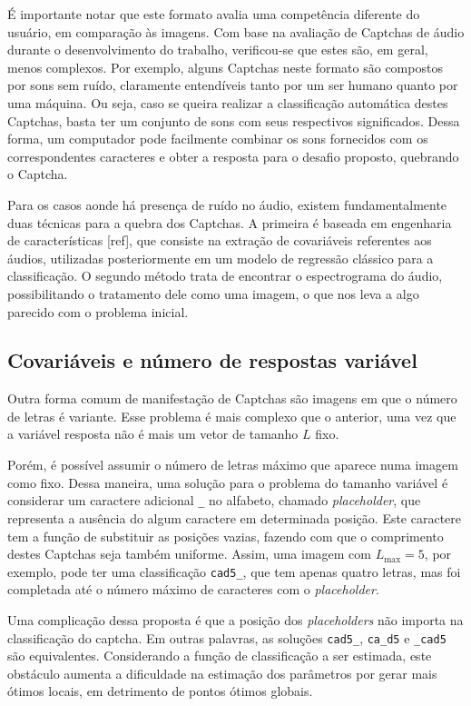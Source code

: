 \documentclass[12pt,]{report}
\begin{document}
É importante notar que este formato avalia uma competência diferente do
usuário, em comparação às imagens. Com base na avaliação de Captchas de
áudio durante o desenvolvimento do trabalho, verificou-se que estes são,
em geral, menos complexos. Por exemplo, alguns Captchas neste formato
são compostos por sons sem ruído, claramente entendíveis tanto por um
ser humano quanto por uma máquina. Ou seja, caso se queira realizar a
classificação automática destes Captchas, basta ter um conjunto de sons
com seus respectivos significados. Dessa forma, um computador pode
facilmente combinar os sons fornecidos com os correspondentes caracteres
e obter a resposta para o desafio proposto, quebrando o Captcha.

Para os casos aonde há presença de ruído no áudio, existem
fundamentalmente duas técnicas para a quebra dos Captchas. A primeira é
baseada em engenharia de características {[}ref{]}, que consiste na
extração de covariáveis referentes aos áudios, utilizadas posteriormente
em um modelo de regressão clássico para a classificação. O segundo
método trata de encontrar o espectrograma do áudio, possibilitando o
tratamento dele como uma imagem, o que nos leva a algo parecido com o
problema inicial.

\subsection{Covariáveis e número de respostas
variável}\label{covariaveis-e-numero-de-respostas-variavel}

Outra forma comum de manifestação de Captchas são imagens em que o
número de letras é variante. Esse problema é mais complexo que o
anterior, uma vez que a variável resposta não é mais um vetor de tamanho
\(L\) fixo.

Porém, é possível assumir o número de letras máximo que aparece numa
imagem como fixo. Dessa maneira, uma solução para o problema do tamanho
variável é considerar um caractere adicional \texttt{\_} no alfabeto,
chamado \emph{placeholder}, que representa a ausência do algum caractere
em determinada posição. Este caractere tem a função de substituir as
posições vazias, fazendo com que o comprimento destes Captchas seja
também uniforme. Assim, uma imagem com \(L_{\max} = 5\), por exemplo,
pode ter uma classificação \texttt{cad5\_}, que tem apenas quatro
letras, mas foi completada até o número máximo de caracteres com o
\emph{placeholder}.

Uma complicação dessa proposta é que a posição dos \emph{placeholders}
não importa na classificação do captcha. Em outras palavras, as soluções
\texttt{cad5\_}, \texttt{ca\_d5} e \texttt{\_cad5} são equivalentes.
Considerando a função de classificação a ser estimada, este obstáculo
aumenta a dificuldade na estimação dos parâmetros por gerar mais ótimos
locais, em detrimento de pontos ótimos globais.
\end{document}
